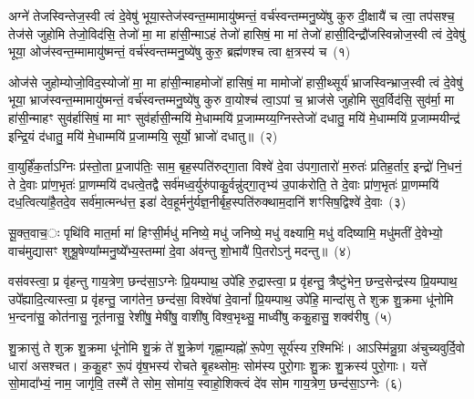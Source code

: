 \setcounter{anuvakam}{0}
अग्ने॑ तेजस्विन्तेज॒स्वी त्वं दे॒वेषु॑ भूया॒स्तेज॑स्वन्त॒म्मामायु॑ष्मन्तं॒ वर्च॑स्वन्तम्मनु॒ष्ये॑षु कुरु दी॒क्षायै॑ च त्वा॒ तप॑सश्च॒ तेज॑से जुहोमि तेजो॒विद॑सि॒ तेजो॑ मा॒ मा हा॑सी॒न्मा\-ऽहं तेजो॑ हासिषं॒ मा मां तेजो॑ हासी॒दिन्द्रौ॑जस्विन्नोज॒स्वी त्वं दे॒वेषु॑ भूया॒ ओज॑स्वन्त॒म्मामायु॑ष्मन्तं॒ वर्च॑स्वन्तम्मनु॒ष्ये॑षु कुरु॒ ब्रह्म॑णश्च त्वा क्ष॒त्रस्य॑ च~(१)

ओज॑से जुहोम्योजो॒विद॒स्योजो॑ मा॒ मा हा॑सी॒न्माहमोजो॑ हासिषं॒ मा मामोजो॑ हासी॒थ्सूर्य॑ भ्राजस्विन्भ्राज॒स्वी त्वं दे॒वेषु॑ भूया॒ भ्राज॑स्वन्त॒म्मामायु॑ष्मन्तं॒ वर्च॑स्वन्तम्मनु॒ष्ये॑षु कुरु वा॒योश्च॑ त्वा॒\-ऽपां च॒ भ्राज॑से जुहोमि सुव॒र्विद॑सि॒ सुव॑र्मा॒ मा हा॑सी॒न्माहꣳ सुव॑र्\mbox{}हासिषं॒ मा माꣳ सुव॑र्\mbox{}हासी॒न्मयि॑ मे॒धाम्मयि॑ प्र॒जाम्मय्य॒ग्निस्तेजो॑ दधातु॒ मयि॑ मे॒धाम्मयि॑ प्र॒जाम्मयीन्द्र॑ इन्द्रि॒यं द॑धातु॒ मयि॑ मे॒धाम्मयि॑ प्र॒जाम्मयि॒ सूर्यो॒ भ्राजो॑ दधातु॥~(२)

{\anuvakamend[{क्ष॒त्रस्य॑ च॒ मयि॒ त्रयो॑विꣳशतिश्च}]}%

वा॒युर्\mbox{}हिं॑क॒र्ता\-ऽग्निः प्र॑स्तो॒ता प्र॒जा\-प॑तिः॒ साम॒ बृह॒स्पति॑रुद्गा॒ता विश्वे॑ दे॒वा उ॑पगा॒तारो॑ म॒रुतः॑ प्रतिह॒र्तार॒ इन्द्रो॑ नि॒धनं॒ ते दे॒वाः प्रा॑ण॒भृतः॑ प्रा॒णम्मयि॑ दधत्वे॒तद्वै सर्व॑मध्व॒र्युरु॑पाकु॒र्वन्नु॑द्गा॒तृभ्य॑ उ॒पाक॑रोति॒ ते दे॒वाः प्रा॑ण॒भृतः॑ प्रा॒णम्मयि॑ दध॒त्वित्या॑है॒तदे॒व सर्व॑मा॒त्मन्ध॑त्त॒ इडा॑ देव॒हूर्मनु॑र्यज्ञ॒नीर्बृह॒स्पति॑रुक्थाम॒दानि॑ शꣳसिष॒द्विश्वे॑ दे॒वाः~(३)

सू॒क्त॒वाच॒ः पृथि॑वि मात॒र्मा मा॑ हिꣳसी॒र्मधु॑ मनिष्ये॒ मधु॑ जनिष्ये॒ मधु॑ वक्ष्यामि॒ मधु॑ वदिष्यामि॒ मधु॑मतीं दे॒वेभ्यो॒ वाच॑मुद्यासꣳ शुश्रू॒षेण्या᳚म्मनु॒ष्ये᳚भ्य॒स्तम्मा॑ दे॒वा अ॑वन्तु शो॒भायै॑ पि॒तरो\-ऽनु॑ मदन्तु॥~(४)

{\anuvakamend[{श॒ꣳ॒सि॒ष॒द्विश्वे॑ दे॒वा अ॒ष्टाविꣳ॑शतिश्च}]}%

वस॑वस्त्वा॒ प्र वृ॑हन्तु गाय॒त्रेण॒ छन्द॑सा॒\-ऽग्नेः प्रि॒यम्पाथ॒ उपे॑हि रु॒द्रास्त्वा॒ प्र वृ॑हन्तु॒ त्रैष्टु॑भेन॒ छन्द॒सेन्द्र॑स्य प्रि॒यम्पाथ॒ उपे᳚ह्यादि॒त्यास्त्वा॒ प्र वृ॑हन्तु॒ जाग॑तेन॒ छन्द॑सा॒ विश्वे॑षां दे॒वानां᳚ प्रि॒यम्पाथ॒ उपे॑हि॒ मान्दा॑सु ते शुक्र शु॒क्रमा धू॑नोमि भ॒न्दना॑सु॒ कोत॑नासु॒ नूत॑नासु॒ रेशी॑षु॒ मेषी॑षु॒ वाशी॑षु विश्व॒भृथ्सु॒ माध्वी॑षु ककु॒हासु॒ शक्व॑रीषु~(५)

शु॒क्रासु॑ ते शुक्र शु॒क्रमा धू॑नोमि शु॒क्रं ते॑ शु॒क्रेण॑ गृह्णा॒म्यह्नो॑ रू॒पेण॒ सूर्य॑स्य र॒श्मिभिः॑। आ\-ऽस्मि॑न्नु॒ग्रा अ॑चुच्यवुर्दि॒वो धारा॑ असश्चत। क॒कु॒हꣳ रू॒पं वृ॑ष॒भस्य॑ रोचते बृ॒हथ्सोमः॒ सोम॑स्य पुरो॒गाः शु॒क्रः शु॒क्रस्य॑ पुरो॒गाः। यत्ते॑ सो॒मादा᳚भ्यं॒ नाम॒ जागृ॑वि॒ तस्मै॑ ते सोम॒ सोमा॑य॒ स्वाहो॒शिक्त्वं दे॑व सोम गाय॒त्रेण॒ छन्द॑सा॒\-ऽग्नेः~(६)

